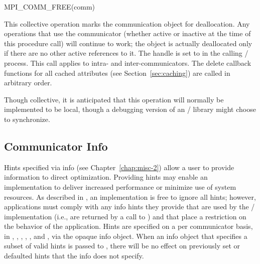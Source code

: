 %
\begin{funcdef}{MPI\_COMM\_FREE}{(\mbox{comm})}
\end{funcdef}

This collective operation marks the communication object for
deallocation.
Any operations that use the communicator  (whether active or inactive at
the time of this procedure call) will continue to work;
the object is actually deallocated only if there are no other active references to it. 
The handle is set to  in the calling \MPI/ process.
This call applies to intra- and inter-communicators. The delete callback
functions for all cached attributes (see Section~\ref{sec:caching}) are
called in arbitrary order.

\begin{implementors}
Though collective, it is anticipated that this operation will normally
be implemented to be local, though
a 
debugging version of an \MPI/ library might
choose to synchronize.
\end{implementors}

\subsection{Communicator Info}
\label{sec:comm-info}

Hints specified via info (see Chapter~\ref{chap:misc-2}) allow a user
to provide information to direct optimization. Providing hints may
enable an implementation to deliver increased performance or minimize
use of system resources. As described in ,
an implementation is free to ignore all hints; however, applications
must comply with any info hints they provide that are used by the \MPI/
implementation (i.e., are returned by a call to
) and that place a restriction on the
behavior of the application.
Hints are specified on a per communicator basis, in
,
,
,
,
, and
,
via the opaque info object. When
an info object that specifies a subset of valid hints is passed to
, there will be no effect on previously
set or defaulted hints that the info does not specify.

